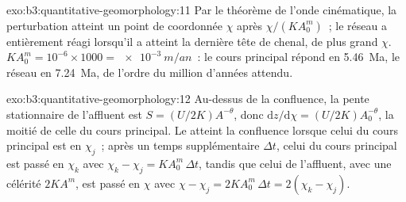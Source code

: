 \begin{solution}{exo:b3:quantitative-geomorphology:11}
Par le théorème de l'onde cinématique, la perturbation atteint un point de coordonnée
$\chi$ après $\chi/(KA_0^m)$~; le réseau a entièrement réagi lorsqu'il a
atteint la dernière tête de chenal, de plus grand $\chi$. $K A_0^m = 10^{-6}\times
1000 = \qty{e-3}{m/an}$~: le cours principal répond en \qty{5.46}{Ma}, le réseau
en \qty{7.24}{Ma}, de l'ordre du million d'années attendu.
\end{solution}

\begin{solution}{exo:b3:quantitative-geomorphology:12}
Au-dessus de la confluence, la pente stationnaire de l'affluent est $S = (U/2K)A^{-\theta}$,
donc $\mathrm{d}z/\mathrm{d}\chi = (U/2K)A_0^{-\theta}$, la moitié de celle du cours principal.
Le  atteint la confluence lorsque celui du cours principal est en $\chi_j$~; après
un temps supplémentaire $\Delta t$, celui du cours principal est passé en $\chi_k$ avec $\chi_k -
\chi_j = K A_0^m\,\Delta t$, tandis que celui de l'affluent, avec une célérité $2KA^m$,
est passé en $\chi$ avec $\chi - \chi_j = 2KA_0^m\,\Delta t = 2(\chi_k -
\chi_j)$.
\end{solution}

